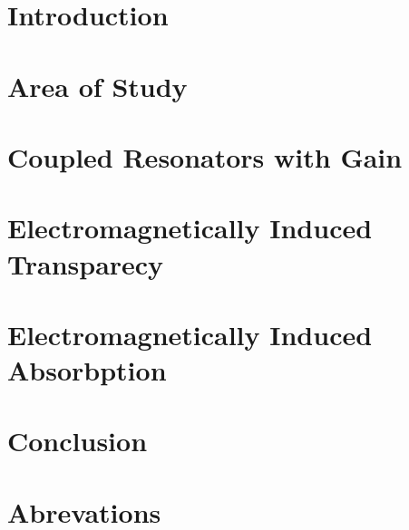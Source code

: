 \documentclass[12pt]{report}
\begin{document}
\tableofcontents

\chapter{Introduction}

 
\chapter{Area of Study}

 
\chapter{Coupled Resonators with Gain}

 
\chapter{Electromagnetically Induced Transparecy}

 
\chapter{Electromagnetically Induced Absorbption}


\chapter{Conclusion}

\appendix
\chapter{Abrevations}

\end{document}
